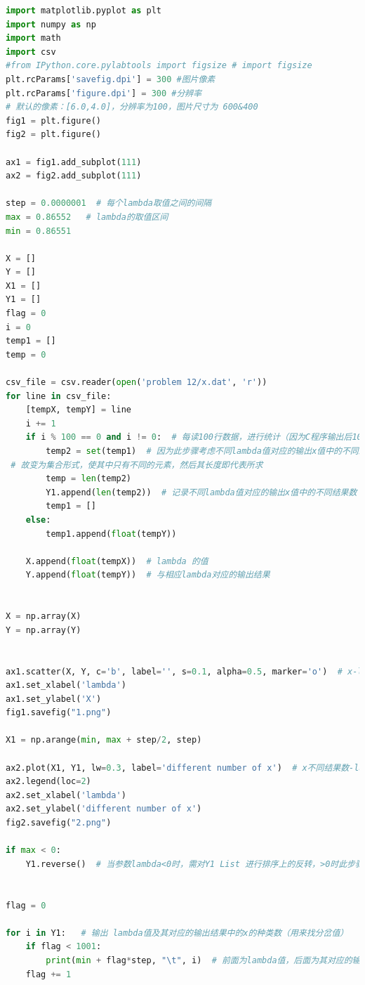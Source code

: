\documentclass[a4paper,11pt]{article}
\begin{document}
\begin{appendices}
\begin{lstlisting}[language = python]
import matplotlib.pyplot as plt
import numpy as np
import math
import csv
#from IPython.core.pylabtools import figsize # import figsize
plt.rcParams['savefig.dpi'] = 300 #图片像素
plt.rcParams['figure.dpi'] = 300 #分辨率
# 默认的像素：[6.0,4.0]，分辨率为100，图片尺寸为 600&400
fig1 = plt.figure()
fig2 = plt.figure()

ax1 = fig1.add_subplot(111)
ax2 = fig2.add_subplot(111)

step = 0.0000001  # 每个lambda取值之间的间隔
max = 0.86552   # lambda的取值区间
min = 0.86551

X = []
Y = []
X1 = []
Y1 = []
flag = 0
i = 0
temp1 = []
temp = 0

csv_file = csv.reader(open('problem 12/x.dat', 'r'))
for line in csv_file:
    [tempX, tempY] = line
    i += 1
    if i % 100 == 0 and i != 0:  # 每读100行数据，进行统计（因为C程序输出后100个迭代值）
        temp2 = set(temp1)  # 因为此步骤考虑不同lambda值对应的输出x值中的不同结果数，
 # 故变为集合形式，使其中只有不同的元素，然后其长度即代表所求
        temp = len(temp2)
        Y1.append(len(temp2))  # 记录不同lambda值对应的输出x值中的不同结果数
        temp1 = []
    else:
        temp1.append(float(tempY))

    X.append(float(tempX))  # lambda 的值
    Y.append(float(tempY))  # 与相应lambda对应的输出结果


X = np.array(X)
Y = np.array(Y)


ax1.scatter(X, Y, c='b', label='', s=0.1, alpha=0.5, marker='o')  # x-lambda散点图
ax1.set_xlabel('lambda')
ax1.set_ylabel('X')
fig1.savefig("1.png")

X1 = np.arange(min, max + step/2, step)

ax2.plot(X1, Y1, lw=0.3, label='different number of x')  # x不同结果数-lambda折线图
ax2.legend(loc=2)
ax2.set_xlabel('lambda')
ax2.set_ylabel('different number of x')
fig2.savefig("2.png")

if max < 0:
    Y1.reverse()  # 当参数lambda<0时，需对Y1 List 进行排序上的反转，>0时此步骤不运行


flag = 0

for i in Y1:   # 输出 lambda值及其对应的输出结果中的x的种类数（用来找分岔值）
    if flag < 1001:
        print(min + flag*step, "\t", i)  # 前面为lambda值，后面为其对应的输出结果中的x的结果数
    flag += 1



\end{lstlisting}


\end{appendices}
\end{document}
